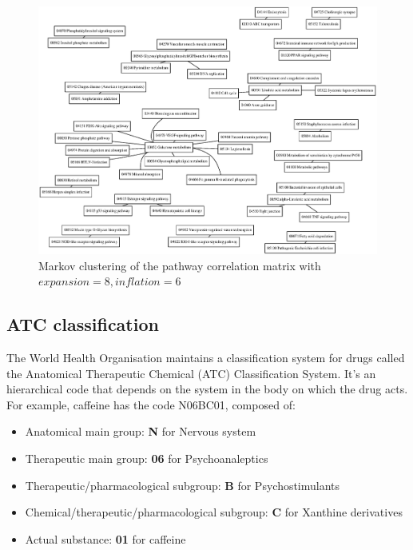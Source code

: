 \documentclass[12pt,a4paper,twoside,openright]{report}
\begin{document}
\begin{landscape}

\begin{figure}[!htb]
\includegraphics[height=\textwidth]{pathway-cluster-small.eps}
\caption{Markov clustering of the pathway correlation matrix with $\mathit{expansion}=8, \mathit{inflation}=6$}
\label{fig:pathway-cluster-small}
\end{figure}

\end{landscape}

\subsection{ATC classification}

The World Health Organisation maintains a classification system for drugs called the Anatomical Therapeutic Chemical (ATC) Classification System. It's an hierarchical code that depends on the system in the body on which the drug acts. For example, caffeine has the code N06BC01, composed of:

\begin{itemize}[noitemsep]
\item Anatomical main group: \textbf{N} for Nervous system
\item Therapeutic main group: \textbf{06} for Psychoanaleptics
\item Therapeutic/pharmacological subgroup: \textbf{B} for Psychostimulants
\item Chemical/therapeutic/pharmacological subgroup: \textbf{C} for Xanthine derivatives
\item Actual substance: \textbf{01} for caffeine
\end{itemize}
\end{document}
